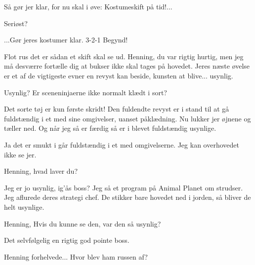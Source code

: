 \documentclass[a4paper,11pt]{article}
\begin{document}
\begin{sketch}
 Så gør jer klar, for nu skal i øve: Kostumeskift på tid!...

 Seriøst?

 ...Gør jeres kostumer klar. 3-2-1 Begynd!


 Flot rus det er sådan et skift skal se ud. Henning, du var rigtig hurtig, men jeg må desværre fortælle dig at bukser ikke skal tages på hovedet. Jeres næste øvelse er et af de vigtigeste evner en revyst kan beside, kunsten at blive... usynlig.

 Usynlig? Er sceneninjaerne ikke normalt klædt i sort?

 Det sorte tøj er kun første skridt! Den fuldendte revyst er i stand til at gå fuldstændig i et med sine omgivelser, uanset påklædning. Nu lukker jer øjnene og tæller ned. Og når jeg så er færdig så er i blevet fuldstændig usynlige.


 Ja det er smukt i går fuldstændig i et med omgivelserne. Jeg kan overhovedet ikke se jer.


 Henning, hvad laver du?

 Jeg er jo usynlig, ig’ås boss? Jeg så et program på Animal Planet om strudser. Jeg aflurede deres strategi chef. De stikker bare hovedet ned i jorden, så bliver de helt usynlige.

 Henning, Hvis du kunne se den, var den så usynlig?

 Det selvfølgelig en rigtig god pointe boss.

 Henning forhelvede... Hvor blev ham russen af?



\end{sketch}
\end{document}
